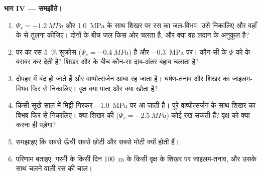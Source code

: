 \begin{problem}
\medskip
\noindent\textbf{भाग IV --- समझौते।}
\begin{enumerate}[resume]
  \item $\Psi_s = \qty{-1.2}{MPa}$ और  \qty{1.0}{MPa} के साथ
        शिखर पर  रस का जल-विभव: उसे निकालिए और वहाँ के  से
        तुलना कीजिए। दोनों के बीच जल किस ओर चलता है, और क्या वह लदान
        के अनुकूल है?
  \item {} पर  का रस \qty{5}{\%} सुक्रोस ($\Psi_s =
        \qty{-0.4}{MPa}$) है और  \qty{-0.3}{MPa} पर। कौन-सी 
         के $\Psi$ को  के बराबर कर देती है? शिखर और  के
        बीच कौन-सा दाब-अंतर बहाव चलाता है?
  \item दोपहर में  बंद हो जाते हैं और वाष्पोत्सर्जन आधा रह जाता
        है। घर्षण-तनाव और शिखर का जाइलम-विभव फिर से निकालिए। वृक्ष क्या
        पाता और क्या खोता है?
  \item किसी सूखे साल में मिट्टी गिरकर \qty{-1.0}{MPa} पर आ जाती है।
        पूरे वाष्पोत्सर्जन के साथ शिखर का विभव फिर से निकालिए। क्या
        शिखर की  ($\Psi_s = \qty{-2.5}{MPa}$) कोई  रख
        सकती हैं? वृक्ष को क्या करना ही पड़ेगा?
  \item समझाइए कि सबसे ऊँची  सबसे छोटी और सबसे मोटी क्यों
        होती हैं।
  \item परिणाम बताइए: गरमी के किसी दिन \qty{100}{m} के किसी वृक्ष के
        शिखर पर जाइलम-तनाव, और उसके साथ चलने वाली रस की चाल।
\end{enumerate}
\end{problem}
